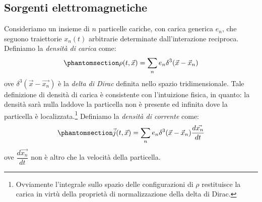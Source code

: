 \subsection{Sorgenti elettromagnetiche}\label{sec:2.2}
Consideriamo un insieme di $n$ particelle cariche, con carica generica $e_n$, che seguono traiettorie $x_n(t)$ arbitrarie determinate dall'interazione reciproca. Definiamo la \textit{densità di carica} come:
\begin{equation}\phantomsection\label{eq:Def_dens_carica}
    \rho(t,\Vec{x})=\sum_n e_n  \delta^3(\Vec{x}-\Vec{x}_n)
\end{equation}
ove $\delta^3(\Vec{x}-\Vec{x_n})$ è la \textit{delta di Dirac} definita nello spazio tridimensionale. Tale definizione di densità di carica è consistente con l'intuizione fisica, in quanto: la densità sarà nulla laddove la particella non è presente ed infinita dove la particella è localizzata.\footnote{Ovviamente l'integrale sullo spazio delle configurazioni di $\rho$ restituisce la carica in virtù della proprietà di normalizzazione della delta di Dirac.}
 Definiamo la \textit{densità di corrente} come:
\begin{equation}\phantomsection\label{eq:Def_dens_corr}
    \Vec{j}(t,\Vec{x})=\sum_n e_n  \delta^3(\Vec{x}-\Vec{x}_n)\dfrac{d\Vec{x_n}}{dt}
\end{equation}
ove $\dfrac{d\Vec{x_n}}{dt}$ non è altro che la velocità della particella.

